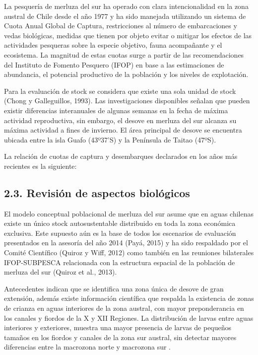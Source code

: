\documentclass[
  spanish,
]{article}
\begin{document}
La pesquería de merluza del sur ha operado con clara intencionalidad en
la zona austral de Chile desde el año 1977 y ha sido manejada utilizando
un sistema de Cuota Anual Global de Captura, restricciones al número de
embarcaciones y vedas biológicas, medidas que tienen por objeto evitar o
mitigar los efectos de las actividades pesqueras sobre la especie
objetivo, fauna acompañante y el ecosistema. La magnitud de estas cuotas
surge a partir de las recomendaciones del Instituto de Fomento Pesquero
(IFOP) en base a las estimaciones de abundancia, el potencial productivo
de la población y los niveles de explotación.

Para la evaluación de stock se considera que existe una sola unidad de
stock (Chong y Galleguillos, 1993). Las investigaciones disponibles
señalan que pueden existir diferencias interanuales de algunas semanas
en la fecha de máxima actividad reproductiva, sin embargo, el desove en
merluza del sur alcanza su máxima actividad a fines de invierno. El área
principal de desove se encuentra ubicada entre la isla Guafo (43º37'S) y
la Península de Taitao (47ºS).

La relación de cuotas de captura y desembarques declarados en los años
más recientes es la siguiente:

\hypertarget{revisiuxf3n-de-aspectos-bioluxf3gicos}{%
\subsection{2.3. Revisión de aspectos
biológicos}\label{revisiuxf3n-de-aspectos-bioluxf3gicos}}

El modelo conceptual poblacional de merluza del sur asume que en aguas
chilenas existe un único stock autosustentable distribuido en toda la
zona económica exclusiva. Este supuesto aún es la base de todos los
escenarios de evaluación presentados en la asesoría del año 2014 (Payá,
2015) y ha sido respaldado por el Comité Científico (Quiroz y Wiff,
2012) como también en las reuniones bilaterales IFOP-SUBPESCA
relacionada con la estructura espacial de la población de merluza del
sur (Quiroz et al., 2013).

Antecedentes indican que se identifica una zona única de desove de gran
extensión, además existe información científica que respalda la
existencia de zonas de crianza en aguas interiores de la zona austral,
con mayor preponderancia en los canales y fiordos de la X y XII
Regiones. La distribución de larvas entre aguas interiores y exteriores,
muestra una mayor presencia de larvas de pequeños tamaños en los fiordos
y canales de la zona sur austral, sin detectar mayores diferencias entre
la macrozona norte y macrozona sur .
\end{document}
